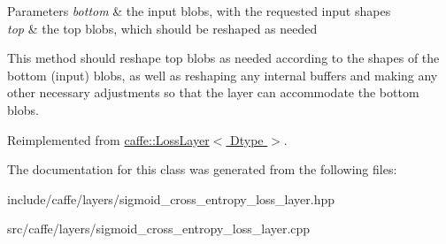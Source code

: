 \begin{DoxyParams}{Parameters}
{\em bottom} & the input blobs, with the requested input shapes \\
\hline
{\em top} & the top blobs, which should be reshaped as needed\\
\hline
\end{DoxyParams}
This method should reshape top blobs as needed according to the shapes of the bottom (input) blobs, as well as reshaping any internal buffers and making any other necessary adjustments so that the layer can accommodate the bottom blobs. 

Reimplemented from \hyperlink{classcaffe_1_1LossLayer_ab15b7120ebc172274481f3732db78c9e}{caffe\+::\+Loss\+Layer$<$ Dtype $>$}.



The documentation for this class was generated from the following files\+:\begin{DoxyCompactItemize}
\item 
include/caffe/layers/sigmoid\+\_\+cross\+\_\+entropy\+\_\+loss\+\_\+layer.\+hpp\item 
src/caffe/layers/sigmoid\+\_\+cross\+\_\+entropy\+\_\+loss\+\_\+layer.\+cpp\end{DoxyCompactItemize}

